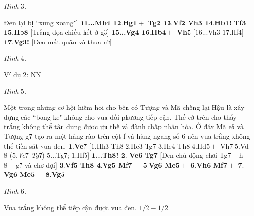 \begin{multicols}{2}
	\begin{center}
		\newgame
		\showboard
		\vskip 0.1cm
		\textit{\small\color{gocco}Hình $3$.}
	\end{center}
	Đen lại bị ``xung xoang"]
	\vskip 0.1cm
	$\pmb{11}$\textbf{\color{gocco}...Mh$\pmb{4}$ $\pmb{12.}$Hg$\pmb{1+}$ Tg$\pmb{2}$ $\pmb{13.}$Vf$\pmb{2}$ Vh$\pmb{3}$ $\pmb{14.}$Hb$\pmb{1}$! Tf$\pmb{3}$ $\pmb{15.}$Hb$\pmb{8}$} [Trắng dọa chiếu hết ở g$3$]
	\vskip 0.1cm
	$\pmb{15}$\textbf{\color{gocco}...Vg$\pmb{4}$ $\pmb{16.}$Hb$\pmb{4+}$ Vh}$\pmb{5}$ [$16$...Vh$3$ $17.$Hf$4$]
	\vskip 0.1cm
	$\pmb{17.}$\textbf{\color{gocco}Vg$\pmb{3}$!} [Đen mất quân và thua cờ]
	\begin{center}
		\newgame
		\showboard
		\vskip 0.1cm
		\textit{\small\color{gocco}Hình $4$.}
	\end{center}
	Ví dụ $2$: NN
	\begin{center}
		\newgame
		\showboard
		\vskip 0.1cm
		\textit{\small\color{gocco}Hình $5$.}
	\end{center}
	Một trong những cơ hội hiếm hoi cho bên có Tượng và Mã chống lại Hậu là xây dựng các ``bong ke" không cho vua đối phương tiếp cận. Thế cờ trên cho thấy trắng không thể tận dụng được ưu thế và đành chấp nhận hòa. Ở đây Mã e$5$ và Tượng g$7$ tạo ra một hàng rào trên cột f và hàng ngang số $6$ nên vua trắng không thế tiến sát vua đen.
	\vskip 0.1cm
	$\pmb{1.}$\textbf{\color{gocco}Ve}$\pmb{7}$ [$1.$Hh$3$ Th$8$ $2.$He$3$ Tg$7$ $3.$He$4$ Th$8$ $4.$Hd$5+$ Vh$7$ $5.$Vd$8$ ($5.$\textit{Ve$7$ Tg}$7$) $5$...Tg$7$; $1.$Hf$5$]
	\vskip 0.1cm
	$\pmb{1}$\textbf{\color{gocco}...Th$\pmb{8}$! $\pmb{2.}$ Ve$\pmb{6}$ Tg}$\pmb{7}$ [Đen chủ động chơi Tg$7-$h$8-$g$7$ và chờ đợi]
	\vskip 0.1cm
	$\pmb{3.}$\textbf{\color{gocco}Vf$\pmb{5}$ Th$\pmb{8}$ $\pmb{4.}$Vg$\pmb{5}$ Mf$\pmb{7+}$ $\pmb{5.}$Vg$\pmb{6}$ Me$\pmb{5+}$ $\pmb{6.}$Vh$\pmb{6}$ Mf$\pmb{7+}$ $\pmb{7.}$Vg$\pmb{6}$ Me$\pmb{5+}$ $\pmb{8.}$Vg$\pmb{5}$}
	\begin{center}
		\newgame
		\showboard
		\vskip 0.1cm
		\textit{\small\color{gocco}Hình $6$.}
	\end{center}
	Vua trắng không thể tiếp cận được vua đen.
	\vskip 0.1cm
	$1/2 - 1/2$.
\end{multicols}




